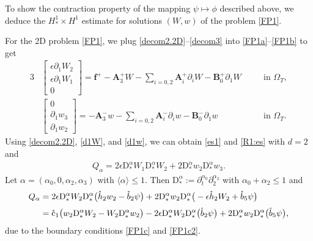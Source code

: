 \documentclass[twoside,11pt]{article}
\numberwithin{equation}{section}
\def\p{\partial}
\begin{document}
To show the contraction property of the mapping ${\psi}\mapsto \phi$ described above,
we deduce the $H_*^1\times H^1$ estimate for solutions $(W,w)$ of the problem \eqref{FP1}.

For the 2D problem \eqref{FP1},
we plug \eqref{decom2.2D}--\eqref{decom3} into \eqref{FP1a}--\eqref{FP1b} to get
\begin{alignat}{3}
	\label{d1W}
	&	\begin{bmatrix}
		\epsilon \p_1 W_2\\   \epsilon \p_1 W_1  \\0
	\end{bmatrix}
	=\bm{f}^+-{\bm{A}}_3^+ W-\sum_{i=0,2}{\bm{A}}_i^+\p_i W-{\bm{B}}_0^+ \p_1W
	\quad &&\textrm{in }\Omega_{T}	,\\
	\label{d1w}	
	&	\begin{bmatrix}
		0\\ \p_1 w_3\\  \p_1 w_2
	\end{bmatrix}
	=-{\bm{A}}_3^- w-\sum_{i=0,2}{\bm{A}}_i^-\p_i w-{\bm{B}}_0^- \p_1w
	\quad &&\textrm{in }\Omega_{T}.
\end{alignat}
Using \eqref{decom2.2D}, \eqref{d1W}, and \eqref{d1w},
we can obtain \eqref{es1} and \eqref{R1:es} with $d=2$ and
\begin{align}
	{Q}_{\alpha}=	2\epsilon\mathrm{D}_*^{\alpha}W_1\mathrm{D}_*^{\alpha}W_2
	+2\mathrm{D}_*^{\alpha}w_2\mathrm{D}_*^{\alpha}w_3.
	\label{Q.alpaha}
\end{align}
Let $\alpha=(\alpha_0, 0 ,\alpha_2,\alpha_3)$ with $\langle \alpha\rangle \leq  1$.
Then
$\mathrm{D}_*^{\alpha}:=\p_t^{\alpha_0}\p_2^{\alpha_2} $ with $\alpha_0+\alpha_2\leq 1$
and
\begin{align}
	{Q}_{\alpha}
	=\; & 2\epsilon \mathrm{D}_*^{\alpha} W_2 \mathrm{D}_*^{\alpha}\big(\mathring{h}_2w_2-\mathring{b}_2 {\psi}\big)
	+2\mathrm{D}_*^{\alpha}w_2 \mathrm{D}_*^{\alpha}\big(-\epsilon \mathring{h}_2 W_2+\mathring{b}_5 {\psi}\big)\nonumber\\[1mm]
	=\; &
	\mathring{\rm c}_1
	\big(w_2\mathrm{D}_*^{\alpha} W_2-W_2\mathrm{D}_*^{\alpha} w_2\big)
	-2\epsilon \mathrm{D}_*^{\alpha} W_2 \mathrm{D}_*^{\alpha}\big(\mathring{b}_2 {\psi}\big)
	+2\mathrm{D}_*^{\alpha}w_2 \mathrm{D}_*^{\alpha}\big(\mathring{b}_5 {\psi}\big), \nonumber
\end{align}
due to the boundary conditions \eqref{FP1c} and \eqref{FP1c2}.
\end{document}
